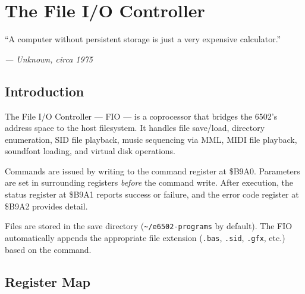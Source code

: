 \chapter{The File I/O Controller}

\epigraph{``A computer without persistent storage is just a very expensive
calculator.''}{\textit{--- Unknown, circa 1975}}

\section*{Introduction}

The File I/O Controller --- FIO --- is a coprocessor that bridges the 6502's
address space to the host filesystem.  It handles file save/load, directory
enumeration, SID file playback, music sequencing via MML, MIDI file playback,
soundfont loading, and virtual disk operations.

Commands are issued by writing to the command register at \$B9A0.  Parameters
are set in surrounding registers \emph{before} the command write.  After
execution, the status register at \$B9A1 reports success or failure, and the
error code register at \$B9A2 provides detail.

Files are stored in the save directory (\texttt{\textasciitilde/e6502-programs}
by default).  The FIO automatically appends the appropriate file extension
(\texttt{.bas}, \texttt{.sid}, \texttt{.gfx}, etc.) based on the command.


\section{Register Map}
\label{sec:fio-registers}

